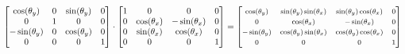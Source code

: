 \documentclass[12pt]{report} \usepackage{preamble}
\begin{document}
\begin{equation}
	\begin{aligned}
		\begin{bmatrix}
			\cos(\theta_y)  & 0 & \sin(\theta_y) & 0 \\
			0               & 1 & 0              & 0 \\
			-\sin(\theta_y) & 0 & \cos(\theta_y) & 0 \\
			0               & 0 & 0              & 1
		\end{bmatrix}
		\cdot
		\begin{bmatrix}
			1 & 0              & 0               & 0 \\
			0 & \cos(\theta_x) & -\sin(\theta_x) & 0 \\
			0 & \sin(\theta_x) & \cos(\theta_x)  & 0 \\
			0 & 0              & 0               & 1
		\end{bmatrix}
		=
		\fontsize{8}{12}\selectfont
		\begin{bmatrix}
			\cos(\theta_y)  & \sin(\theta_y) \sin(\theta_x) & \sin(\theta_y) \cos(\theta_x) & 0 \\
			0               & \cos(\theta_x)                & -\sin(\theta_x)               & 0 \\
			-\sin(\theta_y) & \cos(\theta_y)\sin(\theta_x)  & \cos(\theta_y) \cos(\theta_x) & 0 \\
			0               & 0                             & 0                             & 1
		\end{bmatrix}
	\end{aligned}
\end{equation}
\end{document}
